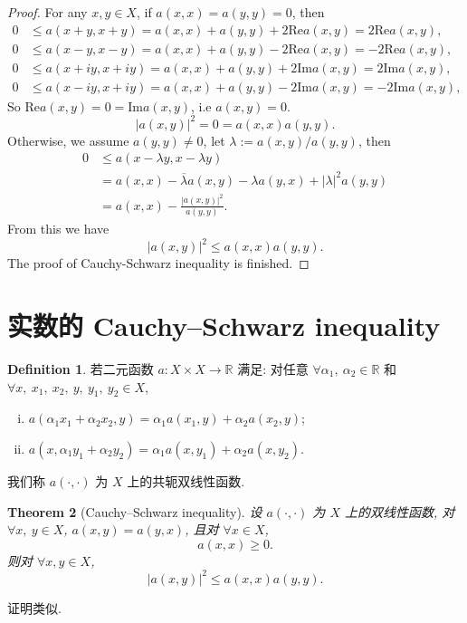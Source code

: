\documentclass[a4paper,12pt]{article}
\newtheorem{theorem}{Theorem}[section]
\theoremstyle{definition}
\newtheorem{definition}[theorem]{Definition}
\begin{document}
\begin{CJK*}{UTF8}{gbsn}
\begin{proof}
    For any $  x, y \in X $, if $ a(x, x) = a(y, y) = 0 $, then
    \begin{align*}
        0 &\leq a(x + y, x + y) = a(x, x) + a(y, y) + 2 \text{Re} a(x, y) = 2 \text{Re} a(x, y), \\
        0 &\leq a(x - y, x - y) = a(x, x) + a(y, y) - 2 \text{Re} a(x, y) = - 2 \text{Re} a(x, y), \\
        0 &\leq a(x + iy, x + iy) = a(x, x) + a(y, y) + 2 \text{Im} a(x, y) = 2 \text{Im} a(x, y), \\
        0 &\leq a(x - iy, x + iy) = a(x, x) + a(y, y) - 2 \text{Im} a(x, y) = - 2 \text{Im} a(x, y),
    \end{align*}
    So $ \text{Re} a(x, y) = 0 = \text{Im} a(x, y) $, i.e $ a(x, y) = 0 $. 
    $$ 
        |a(x, y)|^2 = 0 = a(x, x) a(y, y).
    $$
    Otherwise, we assume $ a(y, y) \neq 0 $, let $ \lambda := a(x, y) / a(y, y) $, then
    \begin{align*}
        0 &\leq a(x - \lambda y, x - \lambda y)\\
          &= a(x, x) - \overline{\lambda} a(x, y) - \lambda a(y, x) + |\lambda|^2 a(y, y) \\
          &= a(x, x) - \frac{|a(x, y)|^2}{a(y, y)}.
    \end{align*}
    From this we have
    $$ 
        |a(x, y)|^2 \leq a(x, x) a(y, y).
    $$
    The proof of Cauchy-Schwarz inequality is finished.
\end{proof}

\section{实数的 Cauchy–Schwarz inequality}

\begin{definition}
    若二元函数 $ a: X \times X \to \mathbb{R} $ 满足: 
    对任意 $ \forall \alpha_1,\ \alpha_2 \in \mathbb{R} $ 和 $ \forall x,\ x_1,\ x_2,\ y,\ y_1,\ y_2 \in X $,
    \begin{enumerate}[(i)]
        \item $ a(\alpha_1 x_1 + \alpha_2 x_2, y) = \alpha_1 a(x_1, y) + \alpha_2 a(x_2, y) $;
        \item $ a(x, \alpha_1 y_1 + \alpha_2 y_2) = \alpha_1 a(x, y_1) + \alpha_2 a(x, y_2) $.
    \end{enumerate}
    我们称 $ a(\cdot, \cdot) $ 为 $ X $ 上的共轭双线性函数.
\end{definition}

\begin{theorem}[Cauchy–Schwarz inequality]
    设 $ a(\cdot, \cdot) $ 为 $ X $ 上的双线性函数, 对 $ \forall x,\ y \in X $,
    $ a(x, y) = a(y, x) $, 且对 $ \forall x \in X $,
    $$
        a(x, x) \geq 0.
    $$
    则对 $ \forall x, y \in X $,
    $$
        |a(x, y)|^2 \leq a(x, x) a(y, y).
    $$
\end{theorem}

证明类似.

\end{CJK*}
\end{document}
